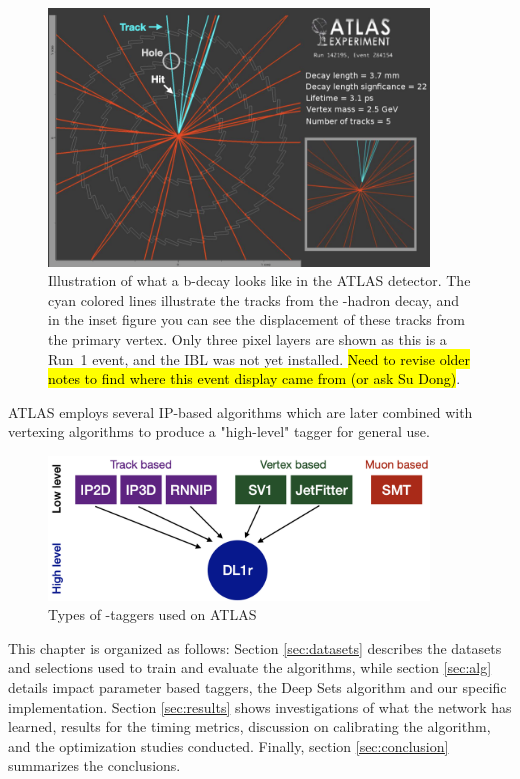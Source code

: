 \begin{figure}[htbp]
  \centering
  \includegraphics[width=0.9\textwidth]{figures/ftag/b-decay-evt-display-annotated}
  \caption{Illustration of what a b-decay looks like in the ATLAS detector. 
  The cyan colored lines illustrate the tracks from the \Pqb-hadron decay, and in the inset figure you can see the displacement of these tracks from the primary vertex. 
  Only three pixel layers are shown as this is a Run~1 event, and the IBL was not yet installed. \hl{Need to revise older notes to find where this event display came from (or ask Su Dong)}. }
  \label{fig:b-jet-graphic}
\end{figure}

ATLAS employs several IP-based algorithms which are later combined with vertexing algorithms to produce a "high-level" tagger for general use.


\begin{figure}[htbp]
  \centering
  \includegraphics[width=0.9\textwidth]{figures/ftag/ATLAS-taggers}
  \caption{Types of \Pqb-taggers used on ATLAS}
  \label{fig:ATLAS-taggers}
\end{figure}

This chapter is organized as follows: Section \ref{sec:datasets} describes the datasets and selections used to train and evaluate the algorithms, while section \ref{sec:alg} details impact parameter based taggers, the Deep Sets algorithm and our specific implementation. Section \ref{sec:results} shows investigations of what the network has learned, results for the timing metrics, discussion on calibrating the algorithm, and the optimization studies conducted. Finally, section \ref{sec:conclusion} summarizes the conclusions.
